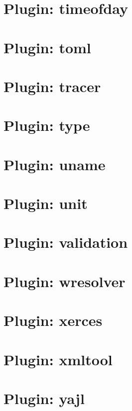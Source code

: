 \documentclass[twoside]{book}
\newcommand{\+}{\discretionary{\mbox{\scriptsize$\hookleftarrow$}}{}{}}
\begin{document}
\chapter{Plugin\+: timeofday}
\label{autotoc_md690}

\chapter{Plugin\+: toml}
\label{autotoc_md693}

\chapter{Plugin\+: tracer}
\label{autotoc_md800}

\chapter{Plugin\+: type}
\label{autotoc_md803}

\chapter{Plugin\+: uname}
\label{autotoc_md810}

\chapter{Plugin\+: unit}
\label{autotoc_md814}

\chapter{Plugin\+: validation}
\label{autotoc_md818}

\chapter{Plugin\+: wresolver}
\label{autotoc_md823}

\chapter{Plugin\+: xerces}
\label{autotoc_md825}

\chapter{Plugin\+: xmltool}
\label{autotoc_md831}

\chapter{Plugin\+: yajl}
\label{autotoc_md835}

\end{document}

